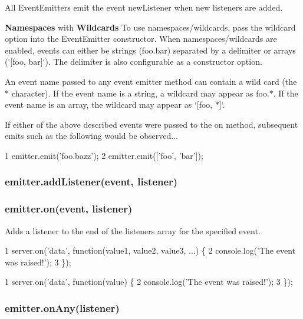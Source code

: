 All Event\+Emitters emit the event {\ttfamily new\+Listener} when new listeners are added.

{\bfseries Namespaces} with {\bfseries Wildcards} To use namespaces/wildcards, pass the {\ttfamily wildcard} option into the Event\+Emitter constructor. When namespaces/wildcards are enabled, events can either be strings ({\ttfamily foo.\+bar}) separated by a delimiter or arrays (`\mbox{[}\textquotesingle{}foo\textquotesingle{}, \textquotesingle{}bar\textquotesingle{}\mbox{]}`). The delimiter is also configurable as a constructor option.

An event name passed to any event emitter method can contain a wild card (the {\ttfamily $\ast$} character). If the event name is a string, a wildcard may appear as {\ttfamily foo.$\ast$}. If the event name is an array, the wildcard may appear as `\mbox{[}\textquotesingle{}foo\textquotesingle{}, \textquotesingle{}$\ast$\textquotesingle{}\mbox{]}`.

If either of the above described events were passed to the {\ttfamily on} method, subsequent emits such as the following would be observed...


\begin{DoxyCode}
1 emitter.emit('foo.bazz');
2 emitter.emit(['foo', 'bar']);
\end{DoxyCode}


\subsubsection*{emitter.\+add\+Listener(event, listener)}

\subsubsection*{emitter.\+on(event, listener)}

Adds a listener to the end of the listeners array for the specified event.


\begin{DoxyCode}
1 server.on('data', function(value1, value2, value3, ...) \{
2   console.log('The event was raised!');
3 \});
\end{DoxyCode}



\begin{DoxyCode}
1 server.on('data', function(value) \{
2   console.log('The event was raised!');
3 \});
\end{DoxyCode}


\subsubsection*{emitter.\+on\+Any(listener)}


